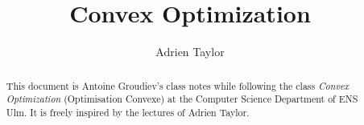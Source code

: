 \documentclass[toc, titlepaged]{../cs-classes/cs-classes}
\title{Convex Optimization}
\author{Adrien Taylor}
\begin{document}
\begin{abstract}
    This document is Antoine Groudiev's class notes while following the class \emph{Convex Optimization} (Optimisation Convexe) at the Computer Science Department of ENS Ulm. It is freely inspired by the lectures of Adrien Taylor.
\end{abstract}





\end{document}
